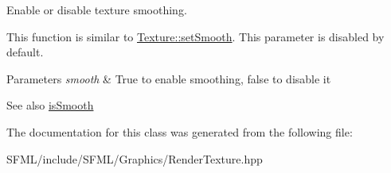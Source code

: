 Enable or disable texture smoothing. 

This function is similar to \mbox{\hyperlink{classsf_1_1_texture_a0c3bd6825b9a99714f10d44179d74324}{Texture\+::set\+Smooth}}. This parameter is disabled by default.


\begin{DoxyParams}{Parameters}
{\em smooth} & True to enable smoothing, false to disable it\\
\hline
\end{DoxyParams}
\begin{DoxySeeAlso}{See also}
\mbox{\hyperlink{classsf_1_1_render_texture_a5b43c007ab6643accc5dae84b5bc8f61}{is\+Smooth}} \begin{DoxyVerb}\end{DoxyVerb}
 
\end{DoxySeeAlso}


The documentation for this class was generated from the following file\+:\begin{DoxyCompactItemize}
\item 
S\+F\+M\+L/include/\+S\+F\+M\+L/\+Graphics/Render\+Texture.\+hpp\end{DoxyCompactItemize}
